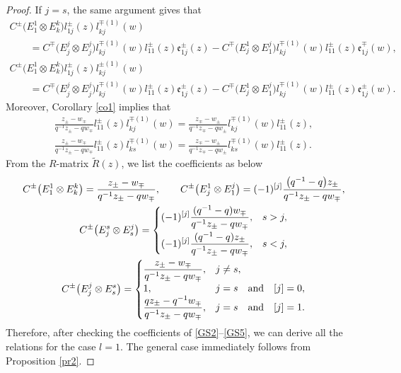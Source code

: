 \documentclass[10pt,a4paper]{amsart}
\numberwithin{equation}{section}
\begin{document}
\begin{proof}
If $j=s$, the same argument gives that
\begin{gather*} %
 C^{\pm}\bigl(E^1_1\otimes E^k_k\bigr)l_{1j}^{\pm}(z)l_{kj}^{\mp(1)}(w) \\
 \qquad=C^{\mp}\bigl(E^j_j\otimes E^j_j\bigr)l_{kj}^{\mp(1)}(w)l_{11}^{\pm}(z)\mathfrak{e}_{1j}^{\pm}(z)-C^{\mp}\bigl(E^1_j\otimes E^j_1\bigr)l_{kj}^{\mp(1)}(w)l_{11}^{\pm}(z)\mathfrak{e}_{1j}^{\mp}(w),
\\
 C^{\pm}\bigl(E^1_1\otimes E^k_k\bigr)l_{1j}^{\pm}(z)l_{kj}^{\pm(1)}(w) \\
\qquad =C^{\mp}\bigl(E^j_j\otimes E^j_j\bigr)l_{kj}^{\mp(1)}(w)l_{11}^{\pm}(z)\mathfrak{e}_{1j}^{\pm}(z)-C^{\mp}\bigl(E^1_j\otimes E^j_1\bigr)l_{kj}^{\mp(1)}(w)l_{11}^{\pm}(z)\mathfrak{e}_{1j}^{\pm}(w).
\end{gather*}
Moreover, Corollary \ref{co1} implies that
\begin{gather}
 \frac{z_{\pm}-w_{\mp}}{q^{-1}z_{\pm}-qw_{\mp}}l_{11}^{\pm}(z)l_{kj}^{\mp(1)}(w)=
 \frac{z_{\mp}-w_{\pm}}{q^{-1}z_{\mp}-qw_{\pm}}l_{kj}^{\mp(1)}(w)l_{11}^{\pm}(z),\nonumber\\
 \frac{z_{\pm}-w_{\mp}}{q^{-1}z_{\pm}-qw_{\mp}}l_{11}^{\pm}(z)l_{ks}^{\mp(1)}(w)=
 \frac{z_{\mp}-w_{\pm}}{q^{-1}z_{\mp}-qw_{\pm}}l_{ks}^{\mp(1)}(w)l_{11}^{\pm}(z).\label{GS5}
\end{gather}
From the $R$-matrix $\widetilde{R}(z)$, we list the coefficients as below
\begin{gather*}
 C^{\pm}\bigl(E^1_1\otimes E^k_k\bigr)=\frac{z_{\pm}-w_{\mp}}{q^{-1}z_{\pm}-qw_{\mp}}, \qquad
 C^{\pm}\bigl(E^1_j\otimes E^j_1\bigr)=(-1)^{[j]}\frac{\bigl(q^{-1}-q\bigr)z_{\pm}}{q^{-1}z_{\pm}-qw_{\mp}},
\\
 C^{\pm}\bigl(E^s_j\otimes E^j_s\bigr)=
 \begin{cases}
\displaystyle (-1)^{[j]}\frac{(q^{-1}-q)w_{\mp}}{q^{-1}z_{\pm}-qw_{\mp}},&s>j,\vspace{1mm}\\
 \displaystyle(-1)^{[j]}\frac{(q^{-1}-q)z_{\pm}}{q^{-1}z_{\pm}-qw_{\mp}},&s<j, \end{cases}
\\
 C^{\pm}\bigl(E^j_j\otimes E^s_s\bigr)=
 \begin{cases}
 \displaystyle \frac{z_{\pm}-w_{\mp}}{q^{-1}z_{\pm}-qw_{\mp}},&j\neq s,\\
 1,&j=s\quad \text{and} \quad[j]=0,\\
 \displaystyle \frac{qz_{\pm}-q^{-1}w_{\mp}}{q^{-1}z_{\pm}-qw_{\mp}},&j=s\quad \text{and} \quad[j]=1. \end{cases}
\end{gather*}
Therefore, after checking the coefficients of \eqref{GS2}--\eqref{GS5}, we can derive all the relations for the case $l=1$. The general case immediately follows from Proposition \ref{pr2}.
\end{proof}
\end{document}
